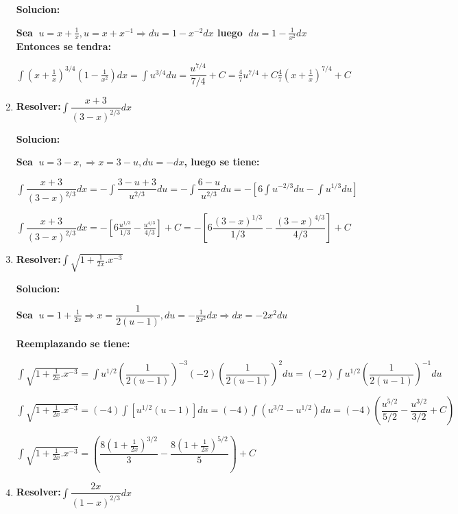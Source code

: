 \documentclass[10pt,a4paper]{book}
\newcommand{\ds}{\displaystyle}
\begin{document}
\begin{enumerate}
        \textbf{Solucion:}

        \textbf{Sea $\ds\ u=x+\frac{1}{x},u=x+x^{-1}\Rightarrow  du=1-x^{-2}dx$ luego $\ds\ du=1-\frac{1}{x^2}dx$}
        \textbf{Entonces se tendra:}

        $\ds\int\left(x+\frac{1}{x} \right)^{3/4}\left(1-\frac{1}{x^2} \right)dx=\int u^{3/4}du=\dfrac{u^{7/4} }{7/4}+C
        =\frac{4}{7}u^{7/4}+C  \frac{4}{7}\left(x+\frac{1}{x} \right)^{7/4}+C$

    \vspace{0.5cm}
    \item \textbf{Resolver:}$\ds\int\dfrac{x+3}{(3-x)^{2/3}}dx$

        \textbf{Solucion:}

        \textbf{Sea $\ds\ u=3-x,\Rightarrow x=3-u,du=-dx$, luego se tiene:}

        $\ds\int\dfrac{x+3}{(3-x)^{2/3}}dx=-\int\dfrac{3-u+3}{u^{2/3}}du=-\int\dfrac{6-u}{u^{2/3}}du=-
        \left[6\int u^{-2/3}du-\int u^{1/3}du\right]$

        $\ds\int\dfrac{x+3}{(3-x)^{2/3}}dx=-\left[6\frac{u^{1/3}}{1/3}-\frac{u^{4/3}}{4/3}\right]+C=-
        \left[6\dfrac{(3-x)^{1/3}}{1/3}-\dfrac{(3-x)^{4/3}}{4/3}\right]+C$
    

    \vspace{0.5cm}
    \item \textbf{Resolver:}$\ds\int\sqrt{1+\frac{1}{2x}.x^{-3}} $
    
        \textbf{Solucion:}

        \textbf{Sea $\ds\ u=1+\frac{1}{2x}\Rightarrow x=\dfrac{1}{2(u-1)},du=-\frac{1}{2x^2}dx\Rightarrow dx=-2x^2du$ }
        
        \textbf{Reemplazando se tiene:}

        $\ds\int\sqrt{1+\frac{1}{2x}.x^{-3}}=\int u^{1/2}\left(\dfrac{1}{2(u-1)}\right)^{-3} (-2)\left(\dfrac{1}{2(u-1)}\right)^{2}
        du=(-2)\int u^{1/2}\left(\dfrac{1}{2(u-1)}\right)^{-1}du$

        $\ds\int\sqrt{1+\frac{1}{2x}.x^{-3}}=(-4)\int[u^{1/2}(u-1)]du=(-4)\int(u^{3/2}-u^{1/2})
        du=(-4)\left(\dfrac{u^{5/2}}{5/2}-\dfrac{u^{3/2}}{3/2}+C\right) $

        $\ds\int\sqrt{1+\frac{1}{2x}.x^{-3}}=\left(\dfrac{8\left(1+\frac{1}{2x}\right)^{3/2}}{3}-\dfrac{8\left(1+\frac{1}{2x}\right)^{5/2}}{5}\right)+C $

    \vspace{0.5cm}
    \item \textbf{Resolver:}$\ds\int\dfrac{2x}{(1-x)^{2/3}}dx$
    

\end{enumerate}
\end{document}
